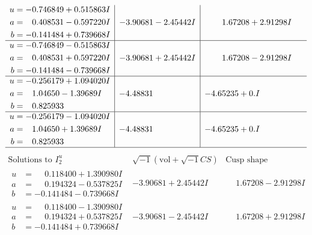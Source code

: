 \documentclass[1p]{elsarticle_modified}
\theoremstyle{definition}
\newcommand{\I}{\sqrt{-1}}
\begin{document}
$$\begin{array}{c|c|c}
\begin{aligned}
u &= -0.746849 + 0.515863 I \\
a &= \phantom{-}0.408531 - 0.597220 I \\
b &= -0.141484 + 0.739668 I\end{aligned}
 & -3.90681 - 2.45442 I & \phantom{-}1.67208 + 2.91298 I \\ \hline\begin{aligned}
u &= -0.746849 - 0.515863 I \\
a &= \phantom{-}0.408531 + 0.597220 I \\
b &= -0.141484 - 0.739668 I\end{aligned}
 & -3.90681 + 2.45442 I & \phantom{-}1.67208 - 2.91298 I \\ \hline\begin{aligned}
u &= -0.256179 + 1.094020 I \\
a &= \phantom{-}1.04650 - 1.39689 I \\
b &= \phantom{-}0.825933\phantom{ +0.000000I}\end{aligned}
 & -4.48831\phantom{ +0.000000I} & -4.65235 + 0. I\phantom{ +0.000000I} \\ \hline\begin{aligned}
u &= -0.256179 - 1.094020 I \\
a &= \phantom{-}1.04650 + 1.39689 I \\
b &= \phantom{-}0.825933\phantom{ +0.000000I}\end{aligned}
 & -4.48831\phantom{ +0.000000I} & -4.65235 + 0. I\phantom{ +0.000000I}\\
 \hline 
 \end{array}$$\newpage$$\begin{array}{c|c|c}  
\text{Solutions to }I^u_{2}& \I (\text{vol} + \sqrt{-1}CS) & \text{Cusp shape}\\
 \hline 
\begin{aligned}
u &= \phantom{-}0.118400 + 1.390980 I \\
a &= \phantom{-}0.194324 - 0.537825 I \\
b &= -0.141484 - 0.739668 I\end{aligned}
 & -3.90681 + 2.45442 I & \phantom{-}1.67208 - 2.91298 I \\ \hline\begin{aligned}
u &= \phantom{-}0.118400 - 1.390980 I \\
a &= \phantom{-}0.194324 + 0.537825 I \\
b &= -0.141484 + 0.739668 I\end{aligned}
 & -3.90681 - 2.45442 I & \phantom{-}1.67208 + 2.91298 I \\ \hline\begin{aligned}

\end{aligned}
\end{array}$$
\end{document}
